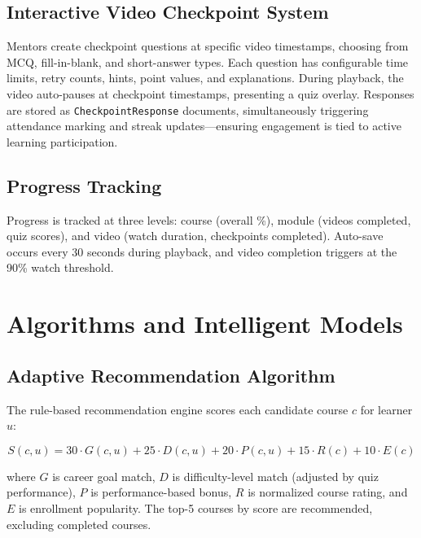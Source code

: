 \documentclass[conference]{IEEEtran}
\begin{document}
\subsection{Interactive Video Checkpoint System}

Mentors create checkpoint questions at specific video timestamps, choosing from MCQ, fill-in-blank, and short-answer types. Each question has configurable time limits, retry counts, hints, point values, and explanations. During playback, the video auto-pauses at checkpoint timestamps, presenting a quiz overlay. Responses are stored as \texttt{CheckpointResponse} documents, simultaneously triggering attendance marking and streak updates---ensuring engagement is tied to active learning participation.

\subsection{Progress Tracking}

Progress is tracked at three levels: course (overall \%), module (videos completed, quiz scores), and video (watch duration, checkpoints completed). Auto-save occurs every 30 seconds during playback, and video completion triggers at the 90\% watch threshold.

\section{Algorithms and Intelligent Models}

\subsection{Adaptive Recommendation Algorithm}

The rule-based recommendation engine scores each candidate course $c$ for learner $u$:

\begin{equation}
S(c, u) = 30 \cdot G(c,u) + 25 \cdot D(c,u) + 20 \cdot P(c,u) + 15 \cdot R(c) + 10 \cdot E(c)
\end{equation}

where $G$ is career goal match, $D$ is difficulty-level match (adjusted by quiz performance), $P$ is performance-based bonus, $R$ is normalized course rating, and $E$ is enrollment popularity. The top-5 courses by score are recommended, excluding completed courses.
\end{document}
